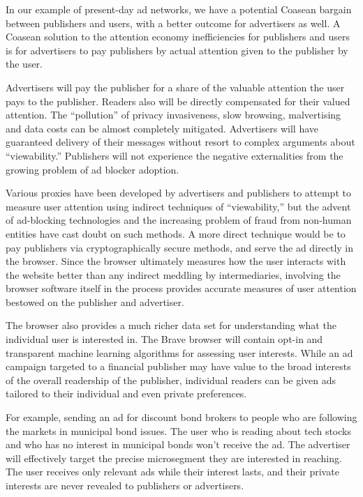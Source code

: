 \documentclass[11pt]{article}
\begin{document}
In our example of present-day ad networks, we have a potential Coasean
bargain between publishers and users, with a better outcome for
advertisers as well. A Coasean solution to the attention economy
inefficiencies for publishers and users is for advertisers to pay
publishers by actual attention given to the publisher by the user. 

Advertisers will pay the publisher for a share of the valuable
attention the user pays to the publisher. Readers also will be
directly compensated for their valued attention. The “pollution” of
privacy invasiveness, slow browsing, malvertising and data costs can
be almost completely mitigated. Advertisers will have guaranteed
delivery of their messages without resort to complex arguments about
“viewability.” Publishers will not experience the negative
externalities from the growing problem of ad blocker adoption. 

Various proxies have been developed by advertisers and publishers to
attempt to measure user attention using indirect techniques of
“viewability,” but the advent of ad-blocking technologies and the
increasing problem of fraud from non-human entities have cast doubt on
such methods. A more direct technique would be to pay publishers via
cryptographically secure methods, and serve the ad directly in the
browser. Since the browser ultimately measures how the user interacts
with the website better than any indirect meddling by intermediaries,
involving the browser software itself in the process provides accurate
measures of user attention bestowed on the publisher and advertiser. 

The browser also provides a much richer data set for understanding
what the individual user is interested in. The Brave browser will
contain opt-in and transparent machine learning algorithms for
assessing user interests. While an ad campaign targeted to a financial
publisher may have value to the broad interests of the overall
readership of the publisher, individual readers can be given ads
tailored to their individual and even private preferences. 

For example, sending an ad for discount bond brokers to people who are
following the markets in municipal bond issues. The user who is
reading about tech stocks and who has no interest in municipal bonds
won’t receive the ad. The advertiser will effectively target the
precise microsegment they are interested in reaching. The user
receives only relevant ads while their interest lasts, and their
private interests are never revealed to publishers or advertisers.
\end{document}
